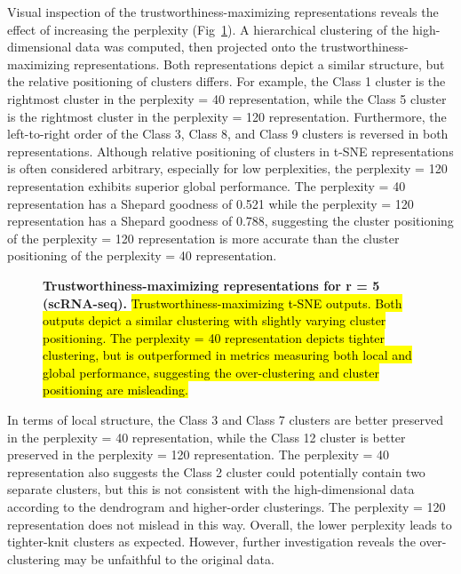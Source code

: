 \documentclass[10pt,letterpaper]{article}
\begin{document}
Visual inspection of the trustworthiness-maximizing representations reveals the effect of increasing the perplexity (Fig~\ref{fig11}). A hierarchical clustering of the high-dimensional data was computed, then projected onto the trustworthiness-maximizing representations. Both representations depict a similar structure, but the relative positioning of clusters differs. For example, the Class 1 cluster is the rightmost cluster in the perplexity = 40 representation, while the Class 5 cluster is the rightmost cluster in the perplexity = 120 representation. Furthermore, the left-to-right order of the Class 3, Class 8, and Class 9 clusters is reversed in both representations. Although relative positioning of clusters in t-SNE representations is often considered arbitrary, especially for low perplexities, the perplexity = 120 representation exhibits superior global performance. The perplexity = 40 representation has a Shepard goodness of 0.521 while the perplexity = 120 representation has a Shepard goodness of 0.788, suggesting the cluster positioning of the perplexity = 120 representation is more accurate than the cluster positioning of the perplexity = 40 representation.

\begin{figure}[!h]
\caption{{\bf Trustworthiness-maximizing representations for r = 5 (scRNA-seq).}
\hl{Trustworthiness-maximizing t-SNE outputs. Both outputs depict a similar clustering with slightly varying cluster positioning. The perplexity = 40 representation depicts tighter clustering, but is outperformed in metrics measuring both local and global performance, suggesting the over-clustering and cluster positioning are misleading.}}
\label{fig11}
\end{figure}

In terms of local structure, the Class 3 and Class 7 clusters are better preserved in the perplexity = 40 representation, while the Class 12 cluster is better preserved in the perplexity = 120 representation. The perplexity = 40 representation also suggests the Class 2 cluster could potentially contain two separate clusters, but this is not consistent with the high-dimensional data according to the dendrogram and higher-order clusterings. The perplexity = 120 representation does not mislead in this way. Overall, the lower perplexity leads to tighter-knit clusters as expected. However, further investigation reveals the over-clustering may be unfaithful to the original data.
\end{document}
